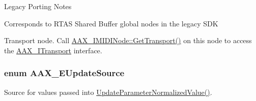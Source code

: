 \begin{Desc}
\begin{description}
\begin{DoxyRefDesc}{Legacy Porting Notes}
\item[\hyperlink{a00384__porting_notes000029}{Legacy Porting Notes}]Corresponds to R\+T\+A\+S Shared Buffer global nodes in the legacy S\+D\+K \end{DoxyRefDesc}
\item[{\em 
\hypertarget{a00206_a5e1dffce35d05990dbbad651702678e4ac2ff856aec0724907dfd95b8e3ccbc20}{}A\+A\+X\+\_\+e\+M\+I\+D\+I\+Node\+Type\+\_\+\+Transport\label{a00206_a5e1dffce35d05990dbbad651702678e4ac2ff856aec0724907dfd95b8e3ccbc20}
}]Transport node. Call \hyperlink{a00105_a57bd132ee74047e25298b157c0bff2f9}{A\+A\+X\+\_\+\+I\+M\+I\+D\+I\+Node\+::\+Get\+Transport()} on this node to access the \hyperlink{a00116}{A\+A\+X\+\_\+\+I\+Transport} interface. \end{description}
\end{Desc}
\hypertarget{a00206_a30be0398faf20c6b121239eb9399f3f7}{}
\subsubsection[{A\+A\+X\+\_\+\+E\+Update\+Source}]{\setlength{\rightskip}{0pt plus 5cm}enum {\bf A\+A\+X\+\_\+\+E\+Update\+Source}}\label{a00206_a30be0398faf20c6b121239eb9399f3f7}


Source for values passed into \hyperlink{a00061_a685858711efb8634ce66c327f2865c71}{Update\+Parameter\+Normalized\+Value()}. 

